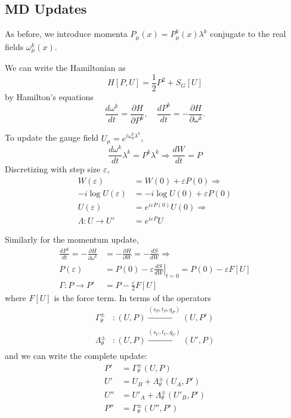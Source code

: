 \documentclass[a4paper,11pt]{article}
\begin{document}
\subsection{\label{subsec:hmc-4dSU3}MD Updates}
%
As before, we introduce momenta $P_{\mu}(x) = P^{k}_{\mu}(x) \lambda^{k}$
conjugate to the real fields $\omega_{\mu}^{k}(x)$.

%
We can write the Hamiltonian as
%
\begin{equation}
    H[P, U] = \frac{1}{2} P^{2} + S_{G}[U]
\end{equation}
%
by Hamilton's equations
%
\begin{equation}
\frac{d\omega^{k}}{dt} = \frac{\partial H}{\partial P^{k}},
\quad \frac{dP^{k}}{dt} = - \frac{\partial H}{\partial \omega^{k}}.
\end{equation}
%

To update the gauge field $U_{\mu} = e^{i\omega_{\mu}^{k} \lambda^{k}}$,
%
\begin{equation}
    \frac{d\omega^{k}}{dt}\lambda^{k} = P^{k} \lambda^{k} \Longrightarrow \frac{dW}{dt} = P
\end{equation}
%
Discretizing with step size $\varepsilon$,
%
\begin{align}
    W(\varepsilon) &= W(0) + \varepsilon P(0) \Longrightarrow \\
    -i \log U(\varepsilon) &= - i \log U(0) + \varepsilon P(0) \\
    U(\varepsilon) &= e^{i \varepsilon P(0)} U(0) \Longrightarrow \\
    \Lambda: U \rightarrow U' &= e^{i \varepsilon P} U
\end{align}
%

Similarly for the momentum update,
%
\begin{align}
    \frac{dP^{k}}{dt} = - \frac{\partial H}{\partial \omega^{k}} &= - \frac{\partial H}{\partial W} = - \frac{dS}{dW} \Longrightarrow \\
    P(\varepsilon) &= P(0) - \varepsilon \left.\frac{dS}{dW}\right|_{t=0} = P(0) - \varepsilon F[U]\\
    \Gamma: P \rightarrow P' &= P - \frac{\varepsilon}{2} F[U]
\end{align}
%
where $F[U]$ is the force term.
%
In terms of the operators
%
\begin{align}
    \Gamma^{\pm}_{\theta}&: (U, P) \xrightarrow[]{\left(s_{P}, t_{P}, q_{P}\right)} (U, P') \\
    \Lambda^{\pm}_{\theta}&: (U, P)\xrightarrow[]{\left(s_{U}, t_{U}, q_{U}\right)} (U', P) 
\end{align}
%
and we can write the complete update:
%
\begin{align}
    P' &= \Gamma^{\pm}_{\theta}(U, P) \\
    U' &= U_{B} + \Lambda^{\pm}_{\theta}(U_{A}, P') \\ 
    U'' &= U'_{A} + \Lambda^{\pm}_{\theta}(U'_{B}, P')\\
    P'' &= \Gamma^{\pm}_{\theta}(U'', P')
\end{align}
%
\end{document}

